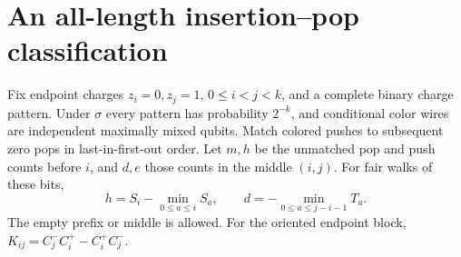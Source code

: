 \documentclass[11pt]{article}
\begin{document}
\section{An all-length insertion--pop classification}
\label{sec:tokens}

Fix endpoint charges $z_i=0,z_j=1$, $0\le i<j<k$, and a complete
binary charge pattern. Under $\sigma$ every pattern has probability
$2^{-k}$, and conditional color wires are independent maximally mixed
qubits. Match colored pushes to subsequent zero pops in last-in-first-out
order. Let $m,h$ be the unmatched pop and push counts before $i$, and
$d,e$ those counts in the middle $(i,j)$. For fair walks of these bits,
\[
 h=S_i-\min_{0\le a\le i}S_a,\qquad
 d=-\min_{0\le a\le j-i-1}T_a.
\]
The empty prefix or middle is allowed. For the oriented endpoint block,
$K_{ij}=C_j^-C_i^+-C_i^+C_j^-$.
\end{document}
